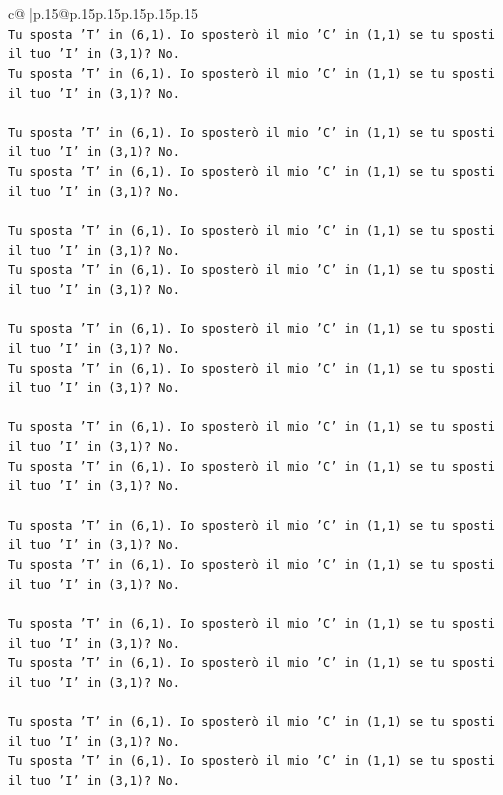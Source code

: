 \documentclass{article}
\begin{document}
{\begin{supertabular}{c@{$\;$}|p{.15\linewidth}@{}p{.15\linewidth}p{.15\linewidth}p{.15\linewidth}p{.15\linewidth}p{.15\linewidth}}
{{{\\ 
\texttt{Tu sposta 'T' in (6,1). Io sposterò il mio 'C' in (1,1) se tu sposti il tuo 'I' in (3,1)? No.} \\
\texttt{Tu sposta 'T' in (6,1). Io sposterò il mio 'C' in (1,1) se tu sposti il tuo 'I' in (3,1)? No.} \\
\\ 
\texttt{Tu sposta 'T' in (6,1). Io sposterò il mio 'C' in (1,1) se tu sposti il tuo 'I' in (3,1)? No.} \\
\texttt{Tu sposta 'T' in (6,1). Io sposterò il mio 'C' in (1,1) se tu sposti il tuo 'I' in (3,1)? No.} \\
\\ 
\texttt{Tu sposta 'T' in (6,1). Io sposterò il mio 'C' in (1,1) se tu sposti il tuo 'I' in (3,1)? No.} \\
\texttt{Tu sposta 'T' in (6,1). Io sposterò il mio 'C' in (1,1) se tu sposti il tuo 'I' in (3,1)? No.} \\
\\ 
\texttt{Tu sposta 'T' in (6,1). Io sposterò il mio 'C' in (1,1) se tu sposti il tuo 'I' in (3,1)? No.} \\
\texttt{Tu sposta 'T' in (6,1). Io sposterò il mio 'C' in (1,1) se tu sposti il tuo 'I' in (3,1)? No.} \\
\\ 
\texttt{Tu sposta 'T' in (6,1). Io sposterò il mio 'C' in (1,1) se tu sposti il tuo 'I' in (3,1)? No.} \\
\texttt{Tu sposta 'T' in (6,1). Io sposterò il mio 'C' in (1,1) se tu sposti il tuo 'I' in (3,1)? No.} \\
\\ 
\texttt{Tu sposta 'T' in (6,1). Io sposterò il mio 'C' in (1,1) se tu sposti il tuo 'I' in (3,1)? No.} \\
\texttt{Tu sposta 'T' in (6,1). Io sposterò il mio 'C' in (1,1) se tu sposti il tuo 'I' in (3,1)? No.} \\
\\ 
\texttt{Tu sposta 'T' in (6,1). Io sposterò il mio 'C' in (1,1) se tu sposti il tuo 'I' in (3,1)? No.} \\
\texttt{Tu sposta 'T' in (6,1). Io sposterò il mio 'C' in (1,1) se tu sposti il tuo 'I' in (3,1)? No.} \\
\\ 
\texttt{Tu sposta 'T' in (6,1). Io sposterò il mio 'C' in (1,1) se tu sposti il tuo 'I' in (3,1)? No.} \\
\texttt{Tu sposta 'T' in (6,1). Io sposterò il mio 'C' in (1,1) se tu sposti il tuo 'I' in (3,1)? No.} \\
}}}
\end{supertabular}}
\end{document}
